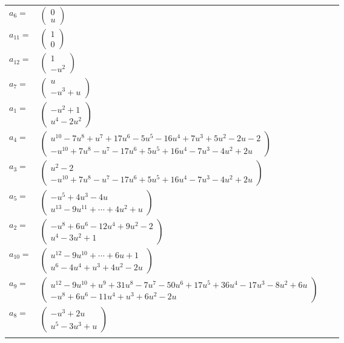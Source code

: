 \documentclass[1p]{elsarticle_modified}
\theoremstyle{definition}
\begin{document}
\begin{tabular}{m{7pt} m{180pt} m{7pt} m{180pt} }
\flushright $a_{6}=$&$\begin{pmatrix}0\\u\end{pmatrix}$ \\
\flushright $a_{11}=$&$\begin{pmatrix}1\\0\end{pmatrix}$ \\
\flushright $a_{12}=$&$\begin{pmatrix}1\\- u^2\end{pmatrix}$ \\
\flushright $a_{7}=$&$\begin{pmatrix}u\\- u^3+u\end{pmatrix}$ \\
\flushright $a_{1}=$&$\begin{pmatrix}- u^2+1\\u^4-2 u^2\end{pmatrix}$ \\
\flushright $a_{4}=$&$\begin{pmatrix}u^{10}-7 u^8+u^7+17 u^6-5 u^5-16 u^4+7 u^3+5 u^2-2 u-2\\- u^{10}+7 u^8- u^7-17 u^6+5 u^5+16 u^4-7 u^3-4 u^2+2 u\end{pmatrix}$ \\
\flushright $a_{3}=$&$\begin{pmatrix}u^2-2\\- u^{10}+7 u^8- u^7-17 u^6+5 u^5+16 u^4-7 u^3-4 u^2+2 u\end{pmatrix}$ \\
\flushright $a_{5}=$&$\begin{pmatrix}- u^5+4 u^3-4 u\\u^{13}-9 u^{11}+\cdots+4 u^2+u\end{pmatrix}$ \\
\flushright $a_{2}=$&$\begin{pmatrix}- u^8+6 u^6-12 u^4+9 u^2-2\\u^4-3 u^2+1\end{pmatrix}$ \\
\flushright $a_{10}=$&$\begin{pmatrix}u^{12}-9 u^{10}+\cdots+6 u+1\\u^6-4 u^4+u^3+4 u^2-2 u\end{pmatrix}$ \\
\flushright $a_{9}=$&$\begin{pmatrix}u^{12}-9 u^{10}+u^9+31 u^8-7 u^7-50 u^6+17 u^5+36 u^4-17 u^3-8 u^2+6 u\\- u^8+6 u^6-11 u^4+u^3+6 u^2-2 u\end{pmatrix}$ \\
\flushright $a_{8}=$&$\begin{pmatrix}- u^3+2 u\\u^5-3 u^3+u\end{pmatrix}$\\&\end{tabular}
\end{document}
